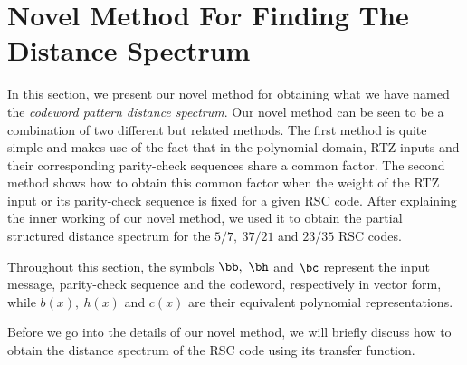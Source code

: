 \section{Novel Method For Finding The Distance Spectrum}
\label{sec5}
In this section, we present our novel method for obtaining what we have named the \textit{codeword pattern distance spectrum}. Our novel method can be seen to be a combination of two different but related methods. The first method is quite simple and makes use of the fact that in the polynomial domain, RTZ inputs and their corresponding parity-check sequences share a common factor. 
The second method shows how to obtain this common factor when the weight of the RTZ input or its parity-check sequence is fixed for a given RSC code. 
After explaining the inner working of our novel method, we used it to obtain the partial structured distance spectrum for the $5/7,~ 37/21$ and $23/35$  RSC codes.

Throughout this section, the symbols $\bb,~\bh$ and $\bc$ represent the input message, parity-check sequence and the codeword, respectively in vector form, while $b(x),~h(x)$ and $c(x)$ are their equivalent polynomial representations. 

Before we go into the details of our novel method, we will briefly discuss how to obtain the distance spectrum of the RSC code using its transfer function. 











